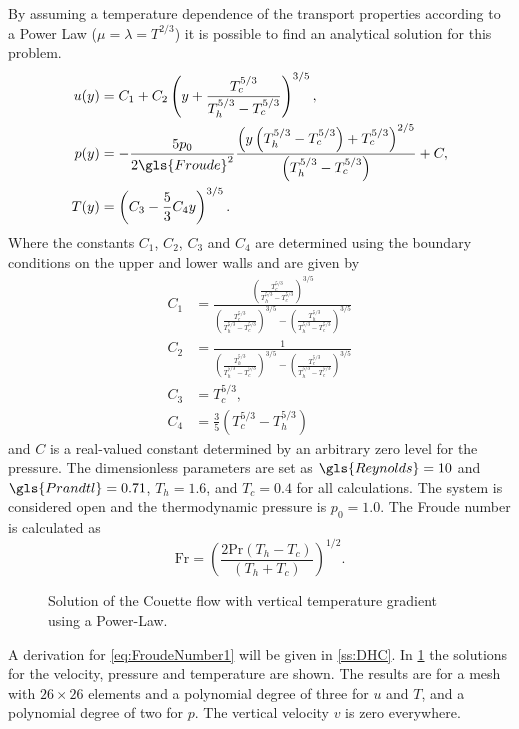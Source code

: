By assuming a temperature dependence of the transport properties according to a Power Law ($\mu = \lambda = T^{2/3}$) it is possible to find an analytical solution for this problem.
\begingroup
\allowdisplaybreaks
\begin{subequations}
    \begin{align}
    	u(y) & = C_1 + C_2\left(y + \frac{T_c^{5/3}}{T_h^{5/3}-T_c^{5/3}} \right)^{3/5},\\
    	p(y) & = -\frac{5p_0}{2\gls{Froude}^2}\frac{\left(y\left(T_h^{5/3}-T_c^{5/3}\right)+T_c^{5/3}\right)^{2/5}}{\left(T_h^{5/3}-T_c^{5/3}\right)}+C,\\
    	T(y) & = \left(C_3 - \frac{5}{3}C_4 y\right)^{3/5}.
    \end{align}\label{eq:AllCouetteSolutions}
\end{subequations}
\endgroup
Where the constants $C_1$, $C_2$, $C_3$ and $C_4$ are determined using the boundary conditions on the upper and lower walls and are given by
\begin{subequations}
\begin{align}
	C_1 & = \frac{\left(\frac{T_c^{5/3}}{T_h^{5/3}-T_c^{5/3}}\right)^{3/5}}{\left(\frac{T_c^{5/3}}{T_h^{5/3}-T_c^{5/3}}\right)^{3/5}-\left(\frac{T_h^{5/3}}{T_h^{5/3}-T_c^{5/3}}\right)^{3/5}} \\
	C_2 & = \frac{1}{\left(\frac{T_h^{5/3}}{T_h^{5/3}-T_c^{5/3}}\right)^{3/5}-\left(\frac{T_c^{5/3}}{T_h^{5/3}-T_c^{5/3}}\right)^{3/5}}                                                        \\
	C_3 & = T_c^{5/3},                                                                                                                                                                         \\
	C_4 & = \frac{3}{5}\left(T_c^{5/3}-T_h^{5/3}\right)
\end{align}
\end{subequations}
and $C$ is a real-valued constant determined by an arbitrary zero level for the pressure. The dimensionless parameters are set as $\gls{Reynolds} = 10$ and $\gls{Prandtl} =0.71$, $T_h = 1.6$, and $T_c = 0.4$ for all calculations. The system is considered open and the thermodynamic pressure is $p_0 =1.0$. The Froude number is calculated as
\begin{equation}
	\text{Fr} = \left( \frac{2\text{Pr}(T_h-T_c)}{(T_h+T_c)}\right)^{1/2}.\label{eq:FroudeNumber1}
\end{equation}%
\begin{center}
	\begin{figure}[bt]
		\pgfplotsset{
			group/xticklabels at=edge bottom,
		}
		\caption{Solution of the Couette flow with vertical temperature gradient using a Power-Law.}\label{fig:CouetteSolution}
	\end{figure}
\end{center}%
A derivation for \cref{eq:FroudeNumber1} will be given in \cref{ss:DHC}. In \cref{fig:CouetteSolution} the solutions for the velocity, pressure and temperature are shown. The results are for a mesh with $26\times26$ elements and a polynomial degree of three for $u$ and $T$, and a polynomial degree of two for $p$. The vertical velocity $v$ is zero everywhere. 

